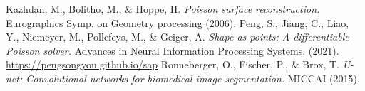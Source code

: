 \documentclass[a4paper,11pt]{article}
\begin{document}
\vspace{-1.5em}
\renewcommand{\refname}{\normalsize Références}
%
\begin{thebibliography}{99}
\vspace{-1em}
{\scriptsize
{}
	Kazhdan, M., Bolitho, M., \& Hoppe, H.
		{\it Poisson surface reconstruction.}
		Eurographics Symp. on Geometry processing (2006).
	Peng, S., Jiang, C., Liao, Y., Niemeyer, M., Pollefeys, M., \& Geiger, A.
		{\it Shape as points: A differentiable Poisson solver.}
		Advances in Neural Information Processing Systems, (2021).
		\hspace{2em}\url{https://pengsongyou.github.io/sap}
	Ronneberger, O., Fischer, P., \& Brox, T.
		{\it U-net: Convolutional networks for biomedical image segmentation.}
		MICCAI (2015).

%
%
%
%
%
}
\end{thebibliography}
\end{document}
